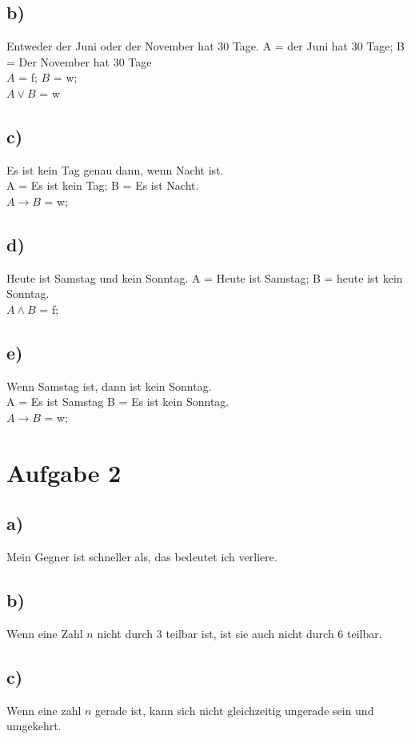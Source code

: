\documentclass{article}
\begin{document}
	\subsection*{b)}
	Entweder der Juni oder der November hat 30 Tage.
	A = der Juni hat 30 Tage; B = Der November hat 30 Tage \\
	$A$ = f; $B$ = w; \\
	$A \lor B$ = w \\
	\subsection*{c)}
	Es ist kein Tag genau dann, wenn Nacht ist. \\
	A = Es ist kein Tag; B = Es ist Nacht. \\
	$A \to B$ = w; \\
	
	\subsection*{d)}
	Heute ist Samstag und kein Sonntag.
	A = Heute ist Samstag; B = heute ist kein Sonntag. \\
	$A \land B$ = f; \\
	
	\subsection*{e)}
	Wenn Samstag ist, dann ist kein Sonntag. \\
	A = Es ist Samstag B = Es ist kein Sonntag. \\
	$A \to B$ = w; \\
	
	\section*{Aufgabe 2}
	\subsection*{a)}
	Mein Gegner ist schneller als, das bedeutet ich verliere. \\
	\subsection*{b)}
	Wenn eine Zahl $n$ nicht durch 3 teilbar ist, ist sie auch nicht durch 6 teilbar.
	\subsection*{c)}
	Wenn eine zahl $n$ gerade ist, kann sich nicht gleichzeitig ungerade sein und umgekehrt.
\end{document}
